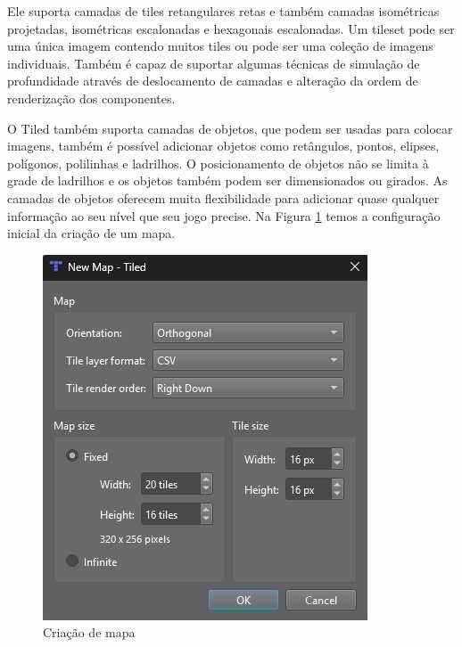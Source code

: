 Ele suporta camadas de tiles retangulares retas e também camadas isométricas projetadas, isométricas escalonadas e hexagonais escalonadas. Um tileset pode ser uma única imagem contendo muitos tiles ou pode ser uma coleção de imagens individuais. Também é capaz de suportar algumas técnicas de simulação de profundidade através de deslocamento de camadas e alteração da ordem de renderização dos componentes.

O Tiled também suporta camadas de objetos, que podem ser usadas para colocar imagens, também é possível adicionar objetos como retângulos, pontos, elipses, polígonos, polilinhas e ladrilhos. O posicionamento de objetos não se limita à grade de ladrilhos e os objetos também podem ser dimensionados ou girados. As camadas de objetos oferecem muita flexibilidade para adicionar quase qualquer informação ao seu nível que seu jogo precise.
Na Figura \ref{fig:map-creation} temos a configuração inicial da criação de um mapa.
\begin{figure}[h!]
    \centering
    \includegraphics[width=0.5\linewidth]{figuras/new-map-tiled.png}
    \caption{Criação de mapa}
    \label{fig:map-creation}
\end{figure}

